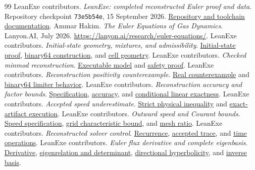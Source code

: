 \documentclass[11pt]{article}
\newcommand{\code}[1]{\texttt{#1}}
\newcommand{\repo}[2]{\href{https://github.com/jsmorph/leanexe/blob/73e5b54ee6ba398cdd4d42feadc42e2c6ec5a33a/#1}{#2}}
\newcommand{\proofref}[2]{\repo{proofs/talos/lean/Project/#1}{#2}}
\begin{document}
\begin{thebibliography}{99}
 LeanExe contributors.  \emph{LeanExe: completed reconstructed Euler proof and data}.  Repository checkpoint \code{73e5b54e}, 15 September 2026.  \repo{README.md}{Repository and toolchain documentation}.
 Ammar Hakim.  \emph{The Euler Equations of Gas Dynamics}.  Lanyon.AI, July 2026.  \url{https://lanyon.ai/research/euler-equations/}.
 LeanExe contributors.  \emph{Initial-state geometry, mixtures, and admissibility}.  \proofref{EulerRiemann/Initial.lean}{Initial-state proof}, \proofref{EulerRiemann/InitialModel.lean}{binary64 construction}, and \proofref{EulerRiemann/Geometry.lean}{cell geometry}.
 LeanExe contributors.  \emph{Checked minmod reconstruction}.  \proofref{EulerRiemann/Reconstruction.lean}{Executable model} and \proofref{EulerRiemann/ReconstructionSafety.lean}{safety proof}.
 LeanExe contributors.  \emph{Reconstruction positivity counterexample}.  \proofref{EulerRiemann/ReconstructionCounterexample.lean}{Real counterexample} and \proofref{EulerRiemann/ReconstructionBoundary.lean}{binary64 limiter behavior}.
 LeanExe contributors.  \emph{Reconstruction accuracy and factor bounds}.  \proofref{EulerReconstruction/Spec.lean}{Specification}, \proofref{EulerRiemann/ReconstructionAccuracy.lean}{accuracy}, and \proofref{EulerRiemann/ReconstructionLinear.lean}{conditional linear exactness}.
 LeanExe contributors.  \emph{Accepted speed underestimate}.  \proofref{EulerRiemann/SpeedCounterexample.lean}{Strict physical inequality} and \proofref{EulerRiemann/ArtifactSpeedCounterexample.lean}{exact-artifact execution}.
 LeanExe contributors.  \emph{Outward speed and Courant bounds}.  \proofref{EulerRiemann/OutwardSpeedSpec.lean}{Speed specification}, \proofref{EulerRiemann/OutwardMaximumCfl.lean}{grid characteristic bound}, and \proofref{EulerRiemann/OutwardMeshSpec.lean}{mesh ratio}.
 LeanExe contributors.  \emph{Reconstructed solver control}.  \proofref{EulerReconstructed/Control.lean}{Recurrence}, \proofref{EulerReconstructed/ControlTrace.lean}{accepted trace}, and \proofref{EulerRiemann/Time.lean}{time operations}.
 LeanExe contributors.  \emph{Euler flux derivative and complete eigenbasis}.  \proofref{Euler2DConservative/RealJacobian.lean}{Derivative}, \proofref{Euler2DConservative/RealEigenvectors.lean}{eigenrelation and determinant}, \proofref{Euler2DConservative/RealHyperbolicity.lean}{directional hyperbolicity}, and \proofref{Euler2DConservative/RealLeftEigenvectors.lean}{inverse basis}.

\end{thebibliography}
\end{document}
